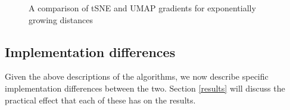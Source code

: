 \documentclass{article}
\theoremstyle{definition}
\begin{document}
\begin{figure}
\centering
	\qquad
	\caption{A comparison of tSNE and UMAP gradients for exponentially growing distances}%
	\label{fig:exp_grads}%
\end{figure}

\subsection{Implementation differences} \label{implementation_diffs}
Given the above descriptions of the algorithms, we now describe specific implementation differences between the two. Section \ref{results} will discuss the
practical effect that each of these has on the results.
\end{document}
